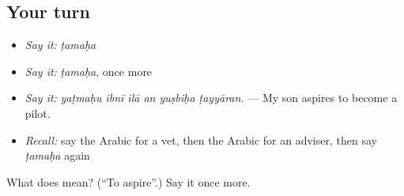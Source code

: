 \subsection*{Your turn}
\begin{itemize}
\raggedright
  \item \emph{Say it:} \emph{ṭamaḥa}
  \item \emph{Say it:} \emph{ṭamaḥa}, once more
  \item \emph{Say it:} \emph{yaṭmaḥu ibnī ilā an yuṣbiḥa ṭayyāran.} — My son aspires to become a pilot.
  \item \emph{Recall:} say the Arabic for a vet, then the Arabic for an adviser, then say \emph{ṭamaḥa} again
\end{itemize}

\begin{tcolorbox}[breakable,colback=teal!4,colframe=teal!35!black,title={Before you move on}]
What does  mean? (\textquotedblleft{}To aspire\textquotedblright{}.) Say it once more.
\end{tcolorbox}
